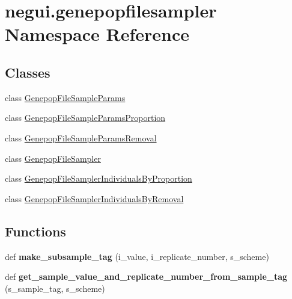 \hypertarget{namespacenegui_1_1genepopfilesampler}{}\section{negui.\+genepopfilesampler Namespace Reference}
\label{namespacenegui_1_1genepopfilesampler}
\subsection*{Classes}
\begin{DoxyCompactItemize}
\item 
class \hyperlink{classnegui_1_1genepopfilesampler_1_1GenepopFileSampleParams}{Genepop\+File\+Sample\+Params}
\item 
class \hyperlink{classnegui_1_1genepopfilesampler_1_1GenepopFileSampleParamsProportion}{Genepop\+File\+Sample\+Params\+Proportion}
\item 
class \hyperlink{classnegui_1_1genepopfilesampler_1_1GenepopFileSampleParamsRemoval}{Genepop\+File\+Sample\+Params\+Removal}
\item 
class \hyperlink{classnegui_1_1genepopfilesampler_1_1GenepopFileSampler}{Genepop\+File\+Sampler}
\item 
class \hyperlink{classnegui_1_1genepopfilesampler_1_1GenepopFileSamplerIndividualsByProportion}{Genepop\+File\+Sampler\+Individuals\+By\+Proportion}
\item 
class \hyperlink{classnegui_1_1genepopfilesampler_1_1GenepopFileSamplerIndividualsByRemoval}{Genepop\+File\+Sampler\+Individuals\+By\+Removal}
\end{DoxyCompactItemize}
\subsection*{Functions}
\begin{DoxyCompactItemize}
\item 
def {\bfseries make\+\_\+subsample\+\_\+tag} (i\+\_\+value, i\+\_\+replicate\+\_\+number, s\+\_\+scheme)\hypertarget{namespacenegui_1_1genepopfilesampler_ae96e15d7e71d700d02ca3ee3609595a4}{}\label{namespacenegui_1_1genepopfilesampler_ae96e15d7e71d700d02ca3ee3609595a4}

\item 
def {\bfseries get\+\_\+sample\+\_\+value\+\_\+and\+\_\+replicate\+\_\+number\+\_\+from\+\_\+sample\+\_\+tag} (s\+\_\+sample\+\_\+tag, s\+\_\+scheme)\hypertarget{namespacenegui_1_1genepopfilesampler_add6542ca0344658bb772d671ef34d761}{}\label{namespacenegui_1_1genepopfilesampler_add6542ca0344658bb772d671ef34d761}

\end{DoxyCompactItemize}
